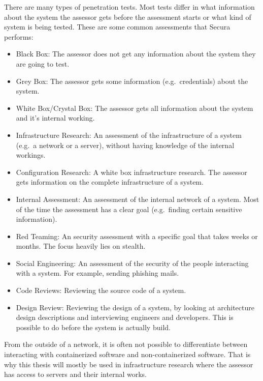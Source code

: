 There are many types of penetration tests. Most tests differ in what information about the system the assessor gets before the assessment starts or what kind of system is being tested. These are some common assessments that Secura performs:
\begin{itemize}
    \item Black Box: The assessor does not get any information about the system they are going to test.
    \item Grey Box: The assessor gets some information (e.g.\ credentials) about the system.
    \item White Box/Crystal Box:  The assessor gets all information about the system and it's internal working.
    \item Infrastructure Research: An assessment of the infrastructure of a system (e.g.\ a network or a server), without having knowledge of the internal workings.
    \item Configuration Research: A white box infrastructure research. The assessor gets information on the complete infrastructure of a system.
    \item Internal Assessment: An assessment of the internal network of a system. Most of the time the assessment has a clear goal (e.g.\ finding certain sensitive information).
    \item Red Teaming: An security assessment with a specific goal that takes weeks or months. The focus heavily lies on stealth.
    \item Social Engineering: An assessment of the security of the people interacting with a system. For example, sending phishing mails.
    \item Code Reviews: Reviewing the source code of a system.
    \item Design Review: Reviewing the design of a system, by looking at architecture design descriptions and interviewing engineers and developers. This is possible to do before the system is actually build.
\end{itemize}

 From the outside of a network, it is often not possible to differentiate between interacting with containerized software and non-containerized software. That is why this thesis will mostly be used in infrastructure research where the assessor has access to servers and their internal works.
